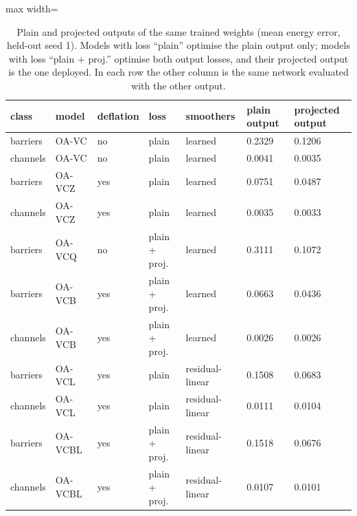 \begin{table}[tbp]\centering\footnotesize\setlength{\tabcolsep}{4pt}
\caption{Plain and projected outputs of the same trained weights (mean energy error, held-out seed 1). Models with loss ``plain'' optimise the plain output only; models with loss ``plain + proj.'' optimise both output losses, and their projected output is the one deployed. In each row the other column is the same network evaluated with the other output.}\label{tab:factorial8}
\begin{adjustbox}{max width=\linewidth}
\begin{tabular}{lllllll}\toprule
class & model & deflation & loss & smoothers & plain output & projected output \\\midrule
barriers & OA-VC & no & plain & learned & 0.2329 & 0.1206 \\
channels & OA-VC & no & plain & learned & 0.0041 & 0.0035 \\
barriers & OA-VCZ & yes & plain & learned & 0.0751 & 0.0487 \\
channels & OA-VCZ & yes & plain & learned & 0.0035 & 0.0033 \\
barriers & OA-VCQ & no & plain + proj. & learned & 0.3111 & 0.1072 \\
barriers & OA-VCB & yes & plain + proj. & learned & 0.0663 & 0.0436 \\
channels & OA-VCB & yes & plain + proj. & learned & 0.0026 & 0.0026 \\
barriers & OA-VCL & yes & plain & residual-linear & 0.1508 & 0.0683 \\
channels & OA-VCL & yes & plain & residual-linear & 0.0111 & 0.0104 \\
barriers & OA-VCBL & yes & plain + proj. & residual-linear & 0.1518 & 0.0676 \\
channels & OA-VCBL & yes & plain + proj. & residual-linear & 0.0107 & 0.0101 \\
\bottomrule\end{tabular}
\end{adjustbox}
\end{table}
